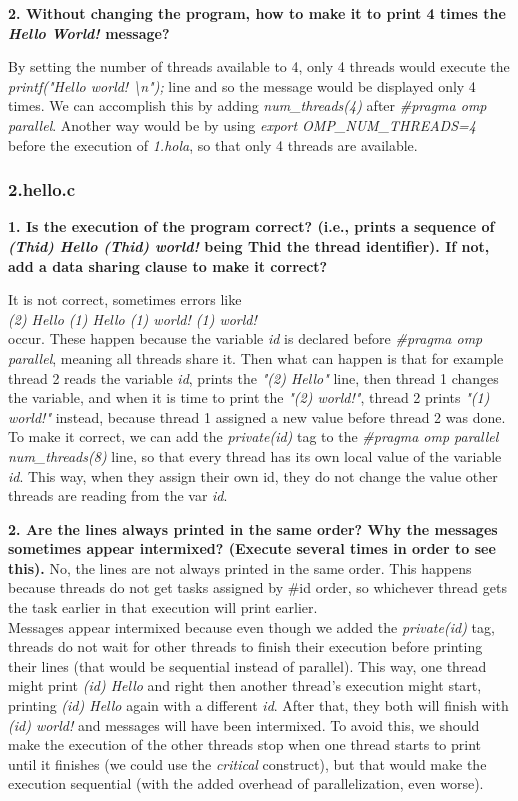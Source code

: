 \documentclass[12]{article}
\begin{document}
\textbf{2. Without changing the program, how to make it to print 4 times the \textit{Hello World!} message?}

By setting the number of threads available to 4, only 4 threads would execute the \textit{printf("Hello world! \textbackslash n");} line and so the message would be displayed only 4 times. We can accomplish this by adding \textit{num\_threads(4)} after \textit{\#pragma omp parallel}. Another way would be by using \textit{export OMP\_NUM\_THREADS=4} before the execution of \textit{1.hola}, so that only 4 threads are available.

\subsubsection{2.hello.c}
\textbf{1. Is the execution of the program correct? (i.e., prints a sequence of \textit{(Thid) Hello (Thid)
world!} being Thid the thread identifier). If not, add a data sharing clause to make it correct?} 

It is not correct, sometimes errors like \\
\textit{(2) Hello (1) Hello (1) world! (1) world!} \\
occur. These happen because the variable \textit{id} is declared before \textit{\#pragma omp parallel}, meaning all threads share it. Then what can happen is that for example thread 2 reads the variable \textit{id}, prints the \textit{"(2) Hello"} line, then thread 1 changes the variable, and when it is time to print the \textit{"(2) world!"}, thread 2 prints \textit{"(1) world!"} instead, because thread 1 assigned a new value before thread 2 was done.
\\
To make it correct, we can add the \textit{private(id)} tag to the \textit{\#pragma omp parallel num\_threads(8)} line, so that every thread has its own local value of the variable \textit{id}. This way, when they assign their own id, they do not change the value other threads are reading from the var \textit{id}.

\textbf{2. Are the lines always printed in the same order? Why the messages sometimes appear intermixed?
(Execute several times in order to see this).}
No, the lines are not always printed in the same order. This happens because threads do not get tasks assigned by \#id order, so whichever thread gets the task earlier in that execution will print earlier.
\\
Messages appear intermixed because even though we added the \textit{private(id)} tag, threads do not wait for other threads to finish their execution before printing their lines (that would be sequential instead of parallel). This way, one thread might print \textit{(id) Hello} and right then another thread's execution might start, printing \textit{(id) Hello} again with a different \textit{id}. After that, they both will finish with \textit{(id) world!} and messages will have been intermixed. To avoid this, we should make the execution of the other threads stop when one thread starts to print until it finishes (we could use the \textit{critical} construct), but that would make the execution sequential (with the added overhead of parallelization, even worse).
\end{document}
